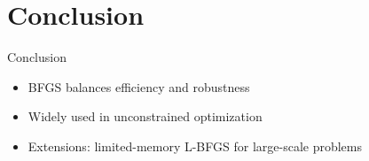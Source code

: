 \documentclass{beamer}
\begin{document}
\section{Conclusion}
\begin{frame}{Conclusion}
	\begin{itemize}
		\item BFGS balances efficiency and robustness
		\item Widely used in unconstrained optimization
		\item Extensions: limited-memory L-BFGS for large-scale problems
	\end{itemize}
\end{frame}
\end{document}
